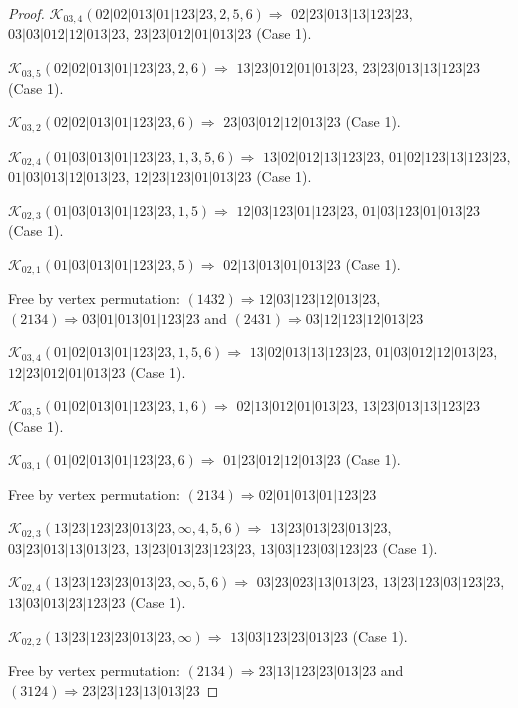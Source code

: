 \documentclass[12pt]{article}
\theoremstyle{plain}
\theoremstyle{definition}
\theoremstyle{remark}
\newcommand{\fancy}[1]{\mathcal{#1}}
\def\K{\fancy{K}}
\begin{document}
\begin{proof}
	$\K_{03,4}(02|02|013|01|123|23,2, 5, 6)\Rightarrow $ $02|23|013|13|123|23$, $03|03|012|12|013|23$, $23|23|012|01|013|23$ (Case 1).
	
	$\K_{03,5}(02|02|013|01|123|23,2, 6)\Rightarrow $ $13|23|012|01|013|23$, $23|23|013|13|123|23$ (Case 1).
	
	$\K_{03,2}(02|02|013|01|123|23,6)\Rightarrow $ $23|03|012|12|013|23$ (Case 1).
	
	
	\bigskip
	
	$\K_{02,4}(01|03|013|01|123|23,1, 3, 5, 6)\Rightarrow $ $13|02|012|13|123|23$, $01|02|123|13|123|23$, $01|03|013|12|013|23$, $12|23|123|01|013|23$ (Case 1).
	
	$\K_{02,3}(01|03|013|01|123|23,1, 5)\Rightarrow $ $12|03|123|01|123|23$, $01|03|123|01|013|23$ (Case 1).
	
	$\K_{02,1}(01|03|013|01|123|23,5)\Rightarrow $ $02|13|013|01|013|23$ (Case 1).
	
	
	
	Free by vertex permutation: $(1 4 3 2)\Rightarrow 12|03|123|12|013|23$, $(2 1 3 4)\Rightarrow 03|01|013|01|123|23$ and $(2 4 3 1)\Rightarrow 03|12|123|12|013|23$
	
	
	
	\bigskip
	
	$\K_{03,4}(01|02|013|01|123|23,1, 5, 6)\Rightarrow $ $13|02|013|13|123|23$, $01|03|012|12|013|23$, $12|23|012|01|013|23$ (Case 1).
	
	$\K_{03,5}(01|02|013|01|123|23,1, 6)\Rightarrow $ $02|13|012|01|013|23$, $13|23|013|13|123|23$ (Case 1).
	
	$\K_{03,1}(01|02|013|01|123|23,6)\Rightarrow $ $01|23|012|12|013|23$ (Case 1).
	
	
	
	Free by vertex permutation: $(2 1 3 4)\Rightarrow 02|01|013|01|123|23$
	
	
	
	\bigskip
	
	$\K_{02,3}(13|23|123|23|013|23,\infty,4, 5, 6)\Rightarrow $ $13|23|013|23|013|23$, $03|23|013|13|013|23$, $13|23|013|23|123|23$, $13|03|123|03|123|23$ (Case 1).
	
	$\K_{02,4}(13|23|123|23|013|23,\infty,5, 6)\Rightarrow $ $03|23|023|13|013|23$, $13|23|123|03|123|23$, $13|03|013|23|123|23$ (Case 1).
	
	$\K_{02,2}(13|23|123|23|013|23,\infty)\Rightarrow $ $13|03|123|23|013|23$ (Case 1).
	
	
	
	Free by vertex permutation: $(2 1 3 4)\Rightarrow 23|13|123|23|013|23$ and $(3 1 2 4)\Rightarrow 23|23|123|13|013|23$
	

\end{proof}
\end{document}
